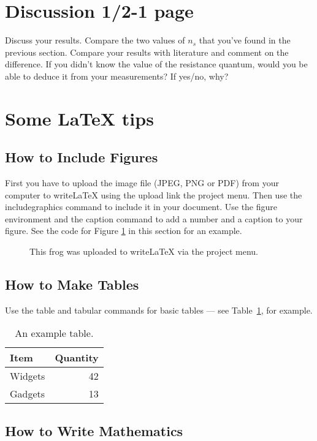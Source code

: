 \documentclass[a4paper]{article}
\begin{document}
\section{Discussion 1/2-1 page}
Discuss your results. Compare the two values of $n_{s}$ that you've found in the previous section. Compare your results with literature and comment on the difference. If you didn't know the value of the resistance quantum, would you be able to deduce it from your measurements? If yes/no, why?

\newpage
\section{Some LaTeX tips}
\label{sec:latex}
\subsection{How to Include Figures}

First you have to upload the image file (JPEG, PNG or PDF) from your computer to writeLaTeX using the upload link the project menu. Then use the includegraphics command to include it in your document. Use the figure environment and the caption command to add a number and a caption to your figure. See the code for Figure \ref{fig:frog} in this section for an example.

\begin{figure}
\centering
\caption{\label{fig:frog}This frog was uploaded to writeLaTeX via the project menu.}
\end{figure}

\subsection{How to Make Tables}

Use the table and tabular commands for basic tables --- see Table~\ref{tab:widgets}, for example.

\begin{table}
\centering
\begin{tabular}{l|r}
Item & Quantity \\\hline
Widgets & 42 \\
Gadgets & 13
\end{tabular}
\caption{\label{tab:widgets}An example table.}
\end{table}

\subsection{How to Write Mathematics}
\end{document}

